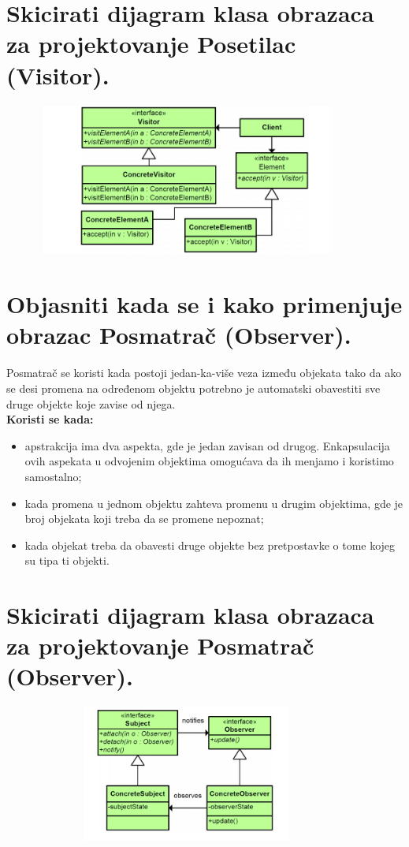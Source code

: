 \documentclass[a4paper]{article}
\begin{document}
\section{Skicirati dijagram klasa obrazaca za projektovanje Posetilac (Visitor).}
  \begin{figure}[H]
    \begin{center}
        \includegraphics[width=100mm,height=50mm]{Slike/dp_visitor.png}
    \end{center}
  \end{figure} 

\section{Objasniti kada se i kako primenjuje obrazac Posmatrač (Observer).}
  Posmatrač se koristi kada postoji jedan-ka-više veza između objekata tako da ako se desi promena 
  na određenom objektu potrebno je automatski obavestiti sve druge objekte koje zavise od njega.\\
  \textbf{Koristi se kada:}
  \begin{itemize}
    \item apstrakcija ima dva aspekta, gde je jedan zavisan od drugog. Enkapsulacija ovih aspekata
          u odvojenim objektima omogućava da ih menjamo i koristimo samostalno;
    \item kada promena u jednom objektu zahteva promenu u drugim objektima, gde je broj
          objekata koji treba da se promene nepoznat;
    \item kada objekat treba da obavesti druge objekte bez pretpostavke o tome kojeg su tipa ti objekti.
  \end{itemize}

\section{Skicirati dijagram klasa obrazaca za projektovanje Posmatrač (Observer).}
  \begin{figure}[H]
    \begin{center}
        \includegraphics[width=100mm,height=45mm]{Slike/dp_observer.png}
    \end{center}
  \end{figure} 
\end{document}
